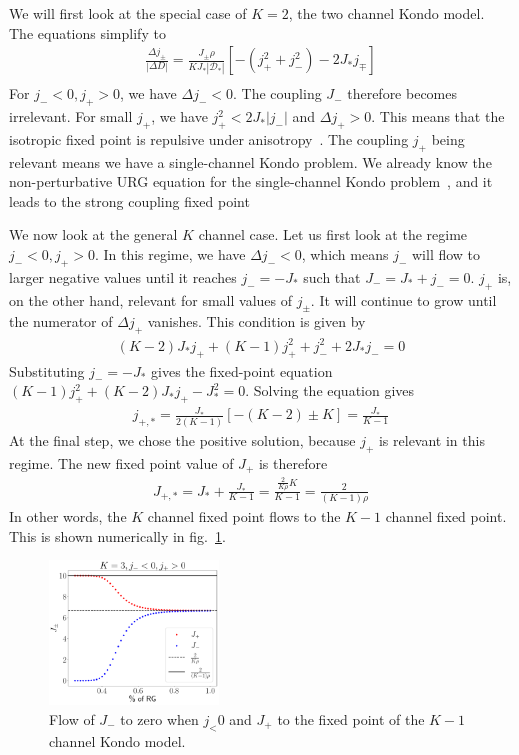 \documentclass[reprint,prb,superscriptaddress]{revtex4-2}
\begin{document}
We will first look at the special case of \(K=2\), the two channel Kondo model. The equations simplify to
\begin{align}
	\frac{\Delta j_\pm}{|\Delta D|} = \frac{J_\pm \rho}{K J_*|\mathcal{D}_*|}\left[- \left(j_+^2 + j_-^2\right) - 2J_* j_\mp\right]\\
\end{align}
For \(j_- < 0, j_+ > 0\), we have \(\Delta j_- < 0\). The coupling \(J_-\) therefore becomes irrelevant. For small \(j_+\), we have \(j_+^2 < 2J_* |j_-|\)  and \(\Delta j_+ > 0\). This means that the isotropic fixed point is repulsive under anisotropy~\cite{Noz_blandin_1980}. The coupling \(j_+\) being relevant means we have a single-channel Kondo problem. We already know the non-perturbative URG equation for the single-channel Kondo problem~\cite{kondo_urg}, and it leads to the strong coupling fixed point

We now look at the general \(K\) channel case. Let us first look at the regime \(j_- < 0, j_+ > 0\). In this regime, we have \(\Delta j_- < 0\), which means \(j_-\) will flow to larger negative values until it reaches \(j_- = -J_*\) such that \(J_- = J_* + j_- = 0\). \(j_+\) is, on the other hand, relevant for small values of \(j_\pm\). It will continue to grow until the numerator of \(\Delta j_+\) vanishes. This condition is given by
\begin{align}
	\left(K - 2\right)J_*j_+ + (K-1)j_+^2 + j_-^2 + 2J_* j_- = 0
\end{align}
Substituting \(j_- = -J_*\) gives the fixed-point equation \((K-1)j_+^2 + \left(K - 2\right)J_*j_+ - J_*^2 = 0\). Solving the equation gives
\begin{align}
	j_{+,*} = \frac{J_*}{2(K-1)}\left[-(K-2) \pm K\right] = \frac{J_*}{K-1}
\end{align}
At the final step, we chose the positive solution, because \(j_+\) is relevant in this regime. The new fixed point value of \(J_+\) is therefore
\begin{align}
	J_{+,*} = J_* + \frac{J_*}{K-1} = \frac{\frac{2}{K \rho} K}{K - 1} = \frac{2}{(K-1)\rho}
\end{align}
In other words, the \(K\) channel fixed point flows to the \(K-1\) channel fixed point. This is shown numerically in fig.~\ref{K_to_K-1}.

\begin{figure}[htpb]
	\centering
	\includegraphics[width=0.4\textwidth]{../numerics/K to K-1.pdf}
	\caption{Flow of \(J_-\) to zero when \(j_< 0\) and \(J_+\) to the fixed point of the \(K-1\) channel Kondo model.}
	\label{K_to_K-1}
\end{figure}
\end{document}
